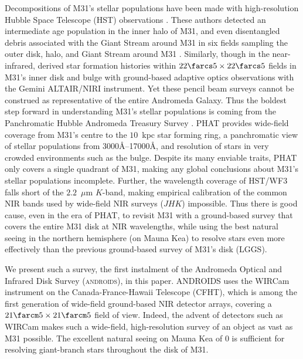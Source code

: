 \documentclass[iop]{emulateapj}
\newcommand{\androids}{\textsc{androids}}
\begin{document}
Decompositions of M31's stellar populations have been made with high-resolution Hubble Space Telescope (HST) observations \citep{Brown:2003,Brown:2006,Brown:2008}.
These authors detected an intermediate age population in the inner halo of M31, and even disentangled debris associated with the Giant Stream around M31 in six fields sampling the outer disk, halo, and Giant Stream around M31 \citep{Brown:2009a}.
Similarly, though in the near-infrared, \cite{Olsen:2006} derived star formation histories within $22\farcs5\times22\farcs5$ fields in M31's inner disk and bulge with ground-based adaptive optics observations with the Gemini ALTAIR/NIRI instrument.
Yet these pencil beam surveys cannot be construed as representative of the entire Andromeda Galaxy.
Thus the boldest step forward in understanding M31's stellar populations is coming from the Panchromatic Hubble Andromeda Treasury Survey \citep[PHAT,][]{Dalcanton:2012}.
PHAT provides wide-field coverage from M31's centre to the $10$~kpc star forming ring, a panchromatic view of stellar populations from 3000\AA--17000\AA, and resolution of stars in very crowded environments such as the bulge.
Despite its many enviable traits, PHAT only covers a single quadrant of M31, making any global conclusions about M31's stellar populations incomplete.
Further, the wavelength coverage of HST/WF3 falls short of the $2.2$~$\mu$m $K$-band, making empirical calibration of the common NIR bands used by wide-field NIR surveys ($JHK$) impossible.
Thus there is good cause, even in the era of PHAT, to revisit M31 with a ground-based survey that covers the entire M31 disk at NIR wavelengths, while using the best natural seeing in the northern hemisphere (on Mauna Kea) to resolve stars even more effectively than the previous ground-based survey of M31's disk (LGGS).

We present such a survey, the first instalment of the Andromeda Optical and Infrared Disk Survey (\androids), in this paper.
ANDROIDS uses the WIRCam instrument \citep{Puget:2004} on the Canada-France-Hawaii Telescope (CFHT), which is among the first generation of wide-field ground-based NIR detector arrays, covering a $21\farcm 5 \times 21\farcm 5$ field of view.
Indeed, the advent of detectors such as WIRCam makes such a wide-field, high-resolution survey of an object as vast as M31 possible.
The excellent natural seeing on Mauna Kea of 0 is sufficient for resolving giant-branch stars throughout the disk of M31.
\end{document}

